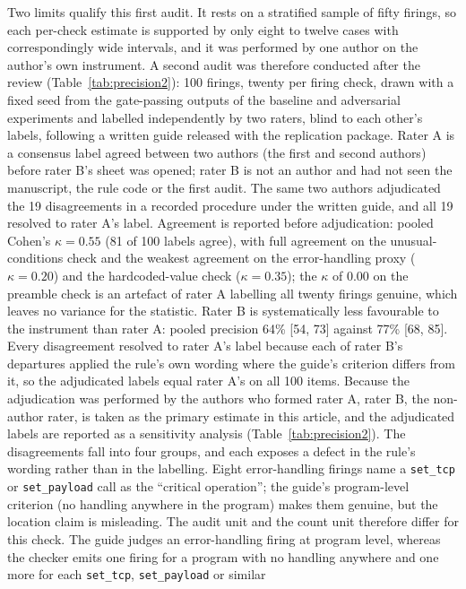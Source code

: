 \documentclass{ieeeaccess}
\begin{document}
Two limits qualify this first audit. It rests on a stratified sample of fifty firings, so
each per-check estimate is supported by only eight to twelve cases with correspondingly
wide intervals, and it was performed by one author on the author's own instrument. A
second audit was therefore conducted after the review (Table~\ref{tab:precision2}): 100
firings, twenty per firing check, drawn with a fixed seed from the gate-passing outputs of
the baseline and adversarial experiments and labelled independently by two raters, blind
to each other's labels, following a written guide released with the replication package.
Rater A is a consensus label agreed between two authors (the first and second authors)
before rater B's sheet was opened; rater B is not an author and had not seen the
manuscript, the rule code or the first audit. The same two authors adjudicated the 19
disagreements in a recorded procedure under the written guide, and all 19 resolved to
rater A's label. Agreement is reported before adjudication: pooled Cohen's
$\kappa=0.55$ (81 of 100 labels agree), with full agreement on the unusual-conditions
check and the weakest
agreement on the error-handling proxy ($\kappa=0.20$) and the hardcoded-value check
($\kappa=0.35$); the $\kappa$ of 0.00 on the preamble check is an artefact of rater A
labelling all twenty firings genuine, which leaves no variance for the statistic. Rater B
is systematically less favourable to the instrument than rater A: pooled precision 64\%
[54, 73] against 77\% [68, 85]. Every disagreement resolved to
rater A's label because each of rater B's departures applied the rule's own wording
where the guide's criterion differs from it, so the adjudicated labels equal rater A's on
all 100 items. Because the adjudication was performed by the authors who formed rater A,
rater B, the non-author rater, is taken as the primary estimate in this article, and the
adjudicated labels are reported as a sensitivity analysis (Table~\ref{tab:precision2}).
The disagreements fall into four groups, and
each exposes a defect in the rule's wording rather than in the labelling. Eight
error-handling firings name a \texttt{set\_tcp} or \texttt{set\_payload} call as the
``critical operation''; the guide's program-level criterion (no handling anywhere in the
program) makes them genuine, but the location claim is misleading. The audit unit and the
count unit therefore differ for this check. The guide judges an error-handling firing at
program level, whereas the checker emits one firing for a program with no handling
anywhere and one more for each \texttt{set\_tcp}, \texttt{set\_payload} or similar
\end{document}
